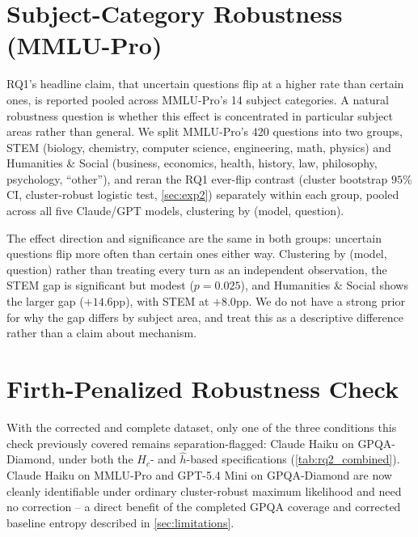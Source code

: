 \section{Subject-Category Robustness (MMLU-Pro)}
\label{app:category_breakdown}

RQ1's headline claim, that uncertain questions flip at a higher rate than certain ones, is reported pooled across MMLU-Pro's 14 subject categories. A natural robustness question is whether this effect is concentrated in particular subject areas rather than general. We split MMLU-Pro's 420 questions into two groups, STEM (biology, chemistry, computer science, engineering, math, physics) and Humanities \& Social (business, economics, health, history, law, philosophy, psychology, ``other''), and reran the RQ1 ever-flip contrast (cluster bootstrap $95\%$ CI, cluster-robust logistic test, \autoref{sec:exp2}) separately within each group, pooled across all five Claude/GPT models, clustering by (model, question).

\begin{table}[t]
\centering
\footnotesize
\setlength{\tabcolsep}{2.5pt}
\renewcommand{\arraystretch}{1.08}

\caption{Certain-versus-uncertain ever-flip rates (RQ1 definition), pooled across five models and split by MMLU-Pro subject group. Brackets show cluster-bootstrap 95\% CIs.}
\label{tab:category_breakdown}


\end{table}

The effect direction and significance are the same in both groups: uncertain questions flip more often than certain ones either way. Clustering by (model, question) rather than treating every turn as an independent observation, the STEM gap is significant but modest ($p=0.025$), and Humanities \& Social shows the larger gap ($+14.6$pp), with STEM at $+8.0$pp. We do not have a strong prior for why the gap differs by subject area, and treat this as a descriptive difference rather than a claim about mechanism.

\section{Firth-Penalized Robustness Check}
\label{app:firth}

With the corrected and complete dataset, only one of the three conditions this check previously covered remains separation-flagged: Claude Haiku on GPQA-Diamond, under both the $H_c$- and $\hat h$-based specifications (\autoref{tab:rq2_combined}). Claude Haiku on MMLU-Pro and GPT-5.4 Mini on GPQA-Diamond are now cleanly identifiable under ordinary cluster-robust maximum likelihood and need no correction -- a direct benefit of the completed GPQA coverage and corrected baseline entropy described in \autoref{sec:limitations}.

